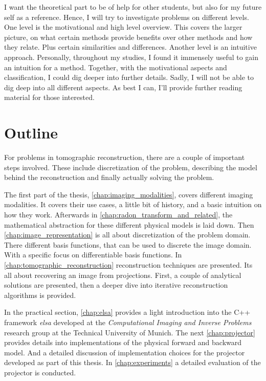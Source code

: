I want the theoretical part to be of help for other students, but also for my future self as a
reference. Hence, I will try to investigate problems on different levels. One level is the
motivational and high level overview. This covers the larger picture, on what certain methods
provide benefits over other methods and how they relate. Plus certain similarities and differences.
Another level is an intuitive approach. Personally, throughout my studies, I found it immensely
useful to gain an intuition for a method. Together, with the motivational aspects and classification,
I could dig deeper into further details. Sadly, I will not be able to dig deep into all different
aspects. As best I can, I'll provide further reading material for those interested.

\section{Outline}\label{sec:outline}

For problems in tomographic reconstruction, there are a couple of important steps involved. These
include discretization of the problem, describing the model behind the reconstruction and finally
actually solving the problem.

The first part of the thesis, \autoref{chap:imaging_modalities}, covers different imaging
modalities. It covers their use cases, a little bit of history, and a basic intuition on how they
work. Afterwards in \autoref{chap:radon_transform_and_related}, the mathematical abstraction for
these different physical models is laid down. Then \autoref{chap:image_representation} is all about
discretization of the problem domain. There different basis functions, that can be used to discrete
the image domain. With a specific focus on differentiable basis functions. In
\autoref{chap:tomographic_reconstruction} reconstruction techniques are presented. Its all about
recovering an image from projections. First, a couple of analytical solutions are presented, then a
deeper dive into iterative reconstruction algorithms is provided.

In the practical section, \autoref{chap:elsa} provides a light introduction into the C++ framework
\textit{elsa} developed at the \textit{Computational Imaging and Inverse Problems} research group at
the Technical University of Munich. The next \autoref{chap:projector} provides details into
implementations of the physical forward and backward model. And a detailed discussion of
implementation choices for the projector developed as part of this thesis. In
\autoref{chap:experiments} a detailed evaluation of the projector is conducted.

